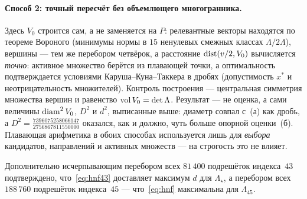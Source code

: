 \paragraph{Способ 2: точный пересчёт без объемлющего многогранника.}
Здесь $V_0$ строится сам, а не заменяется на $P$: релевантные векторы
находятся по теореме Вороного (минимумы нормы в $15$ ненулевых смежных классах
$\Lambda/2\Lambda$), вершины --- тем же перебором четвёрок, а расстояние
$\operatorname{dist}(v/2,V_0)$ вычисляется \emph{точно}: активное множество берётся из
плавающей точки, а оптимальность подтверждается условиями Каруша--Куна--Таккера
в дробях (допустимость $x^*$ и неотрицательность множителей). Контроль
построения --- центральная симметрия множества вершин и равенство
$\operatorname{vol} V_0=\det\Lambda$. Результат --- не оценка, а сами величины
$\operatorname{diam}^2V_0$, $D^2$ и $d^2$, выписанные выше: диаметр совпал с~(а) как дробь,
а $D^2=\tfrac{7396075258066147}{2756867811550000}$ оказался, как и должно,
чуть больше опорной оценки~(б).
Плавающая арифметика в обоих способах используется лишь для \emph{выбора}
кандидатов, направлений и активных множеств --- на строгость это не влияет.

Дополнительно исчерпывающим перебором всех $81\,400$ подрешёток индекса~$43$
подтверждено, что~\eqref{eq:hnf43} доставляет максимум $d$ для
$\Lambda_\star$, а перебором всех $188\,760$ подрешёток индекса~$45$ ---
что~\eqref{eq:hnf} максимальна для $\Lambda_{45}$.
